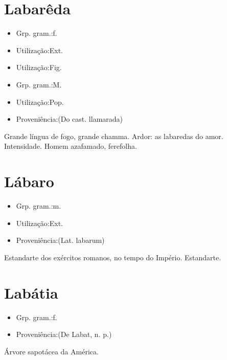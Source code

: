 \section{Labarêda}
\begin{itemize}
\item {Grp. gram.:f.}
\end{itemize}
\begin{itemize}
\item {Utilização:Ext.}
\end{itemize}
\begin{itemize}
\item {Utilização:Fig.}
\end{itemize}
\begin{itemize}
\item {Grp. gram.:M.}
\end{itemize}
\begin{itemize}
\item {Utilização:Pop.}
\end{itemize}
\begin{itemize}
\item {Proveniência:(Do cast. \textunderscore llamarada\textunderscore )}
\end{itemize}
Grande língua de fogo, grande chamma.
Ardor: \textunderscore as labaredas do amor\textunderscore .
Intensidade.
Homem azafamado, ferefolha.
\section{Lábaro}
\begin{itemize}
\item {Grp. gram.:m.}
\end{itemize}
\begin{itemize}
\item {Utilização:Ext.}
\end{itemize}
\begin{itemize}
\item {Proveniência:(Lat. \textunderscore labarum\textunderscore )}
\end{itemize}
Estandarte dos exércitos romanos, no tempo do Império.
Estandarte.
\section{Labátia}
\begin{itemize}
\item {Grp. gram.:f.}
\end{itemize}
\begin{itemize}
\item {Proveniência:(De \textunderscore Labat\textunderscore , n. p.)}
\end{itemize}
Árvore sapotácea da América.
